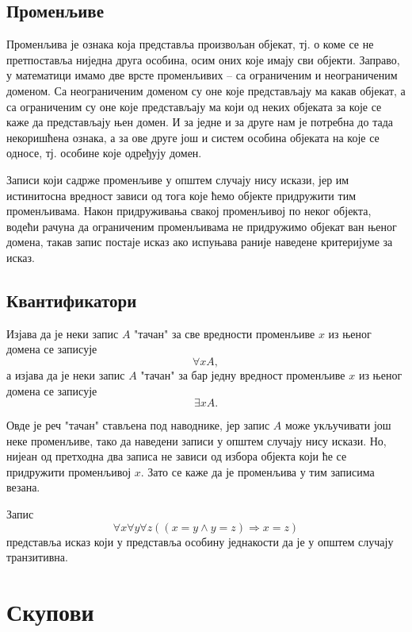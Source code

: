 \documentclass[a4paper]{book}
\newcommand{\tj}{\mbox{тј.} }
\begin{document}
\subsection{Променљиве}

\indent

Променљива је ознака која представља произвољан објекат, \tj о коме се не пре\-тпо\-ста\-вља ниједна друга особина,
осим оних које имају сви објекти. Заправо, у математици имамо две врсте променљивих -- са ограниченим и неограниченим
доменом.
Са неограниченим доменом су оне које представљају ма какав објекат, а са ограниченим су оне које пред\-ста\-вља\-ју ма који од
неких објеката за које се каже да представљају њен домен.
И за једне и за друге нам је потребна до тада некоришћена ознака, а за ове друге још и систем особина објеката на које
се односе, \tj особине које одређују домен.

Записи који садрже променљиве у општем случају нису искази, јер им истинитосна вредност зависи од тога које ћемо
објекте придружити тим променљивама. Након при\-дру\-жи\-ва\-ња свакој променљивој по неког објекта, водећи рачуна да
ограниченим променљивама не придружимо објекат ван њеног домена, такав запис постаје исказ ако испуњава раније
наведене критеријуме за исказ.

\subsection{Квантификатори}

\indent

Изјава да је неки запис $A$ "тачан" за све вредности променљиве $x$ из њеног домена се записује
$$
\forall xA,
$$
а изјава да је неки запис $A$ "тачан" за бар једну вредност променљиве $x$ из њеног домена се записује
$$
\exists xA.
$$

Овде је реч "тачан" стављена под наводнике, јер запис $A$ може укључивати још неке променљиве, тако да наведени
записи у општем случају нису искази. Но, нијеан од прет\-хо\-дна два записа не зависи од избора објекта који ће се
придружити променљивој $x$. Зато се каже да је променљива у тим записима везана.

Запис
$$
\forall x\forall y\forall z((x=y\land y=z)\Rightarrow x=z)
$$
представља исказ који у представља особину једнакости да је у општем случају транзитивна.

\section{Скупови}
\end{document}
